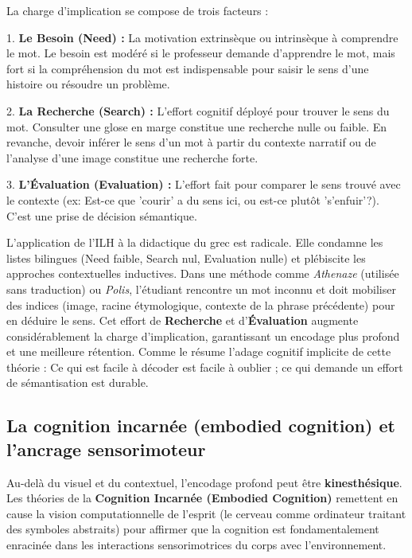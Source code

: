 La charge d'implication se compose de trois facteurs :

1. \textbf{Le Besoin (Need) :} La motivation extrinsèque ou intrinsèque à comprendre le mot. Le
besoin est \og modéré\fg{} si le professeur demande d'apprendre le mot, mais \og fort\fg{} si la
compréhension du mot est indispensable pour saisir le sens d'une histoire ou résoudre un
problème.\cite{III-1-3-ref27}

2. \textbf{La Recherche (Search) :} L'effort cognitif déployé pour trouver le sens du mot. Consulter
une glose en marge constitue une recherche nulle ou faible. En revanche, devoir inférer le sens d'un
mot à partir du contexte narratif ou de l'analyse d'une image constitue une recherche forte.

3. \textbf{L'Évaluation (Evaluation) :} L'effort fait pour comparer le sens trouvé avec le contexte
(ex: \og Est-ce que 'courir' a du sens ici, ou est-ce plutôt 's'enfuir'?\fg{}). C'est une prise de
décision sémantique.\cite{III-1-3-ref28}

L'application de l'ILH à la didactique du grec est radicale. Elle condamne les listes bilingues
(Need faible, Search nul, Evaluation nulle) et plébiscite les approches contextuelles inductives.
Dans une méthode comme \textit{Athenaze} (utilisée sans traduction) ou \textit{Polis}, l'étudiant
rencontre un mot inconnu et doit mobiliser des indices (image, racine étymologique, contexte de la
phrase précédente) pour en déduire le sens. Cet effort de \textbf{Recherche} et
d'\textbf{Évaluation} augmente considérablement la charge d'implication, garantissant un encodage
plus profond et une meilleure rétention. Comme le résume l'adage cognitif implicite de cette théorie
: \og Ce qui est facile à décoder est facile à oublier ; ce qui demande un effort de sémantisation
est durable\fg{}.



\subsection{La cognition incarnée (embodied cognition) et l'ancrage sensorimoteur}

Au-delà du visuel et du contextuel, l'encodage profond peut être \textbf{kinesthésique}. Les
théories de la \textbf{Cognition Incarnée (Embodied Cognition)} remettent en cause la vision
computationnelle de l'esprit (le cerveau comme ordinateur traitant des symboles abstraits) pour
affirmer que la cognition est fondamentalement enracinée dans les interactions sensorimotrices du
corps avec l'environnement.\cite{III-1-3-ref29}


